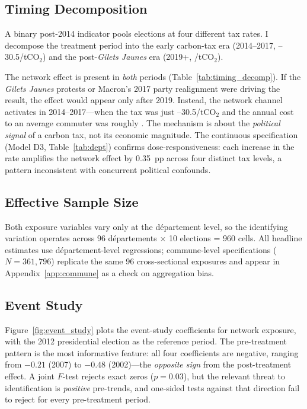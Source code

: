\documentclass[12pt]{article}
\providecommand{\euro}{\texteuro}
\newcommand{\gj}{\textit{Gilets Jaunes}}
\newcommand{\dept}{d\'{e}partement}
\newcommand{\depts}{d\'{e}partements}
\begin{document}
\subsection{Timing Decomposition}
\label{sec:timing}

A binary post-2014 indicator pools elections at four different tax rates. I decompose the treatment period into the early carbon-tax era (2014--2017, \euro 7--30.5/tCO$_2$) and the post-\gj{} era (2019+, \euro 44.6/tCO$_2$).



The network effect is present in \emph{both} periods (Table~\ref{tab:timing_decomp}). If the \gj{} protests or Macron's 2017 party realignment were driving the result, the effect would appear only after 2019. Instead, the network channel activates in 2014--2017---when the tax was just \euro 7--30.5/tCO$_2$ and the annual cost to an average commuter was roughly \euro 20. The mechanism is about the \emph{political signal} of a carbon tax, not its economic magnitude. The continuous specification (Model D3, Table~\ref{tab:dept}) confirms dose-responsiveness: each \euro 10 increase in the rate amplifies the network effect by 0.35~pp across four distinct tax levels, a pattern inconsistent with concurrent political confounds.

\subsection{Effective Sample Size}
\label{sec:effective_n}

Both exposure variables vary only at the \dept{} level, so the identifying variation operates across 96 \depts{} $\times$ 10 elections = 960 cells. All headline estimates use \dept{}-level regressions; commune-level specifications ($N = 361{,}796$) replicate the same 96 cross-sectional exposures and appear in Appendix~\ref{app:commune} as a check on aggregation bias.

\subsection{Event Study}
\label{sec:event_study}

Figure~\ref{fig:event_study} plots the event-study coefficients for network exposure, with the 2012 presidential election as the reference period. The pre-treatment pattern is the most informative feature: all four coefficients are negative, ranging from $-0.21$ (2007) to $-0.48$ (2002)---the \emph{opposite sign} from the post-treatment effect. A joint $F$-test rejects exact zeros ($p = 0.03$), but the relevant threat to identification is \emph{positive} pre-trends, and one-sided tests against that direction fail to reject for every pre-treatment period.
\end{document}

